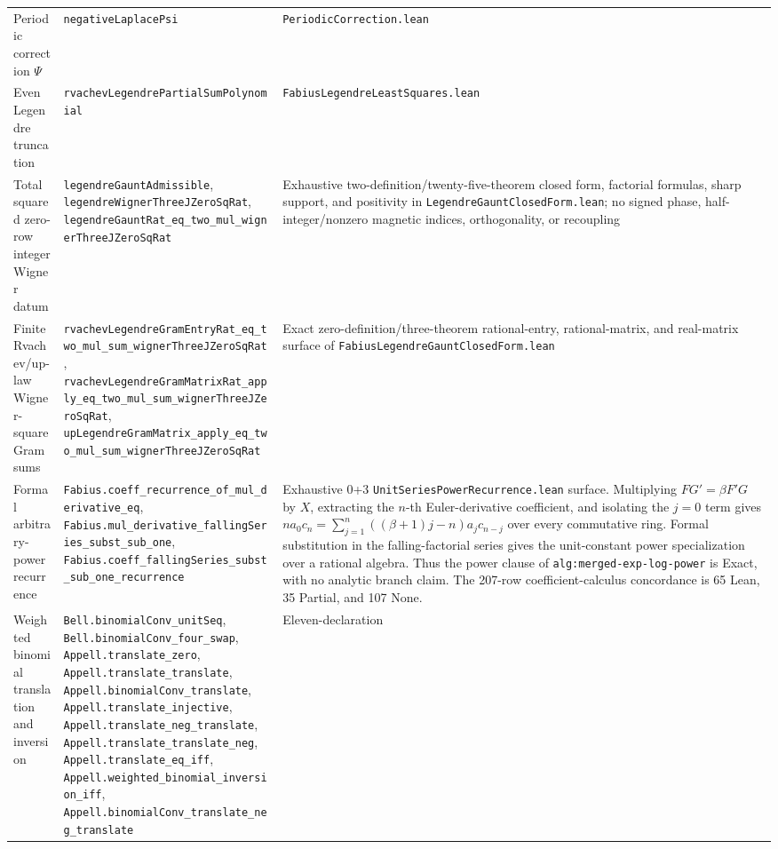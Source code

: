 \documentclass[11pt,oneside]{article}
\theoremstyle{definition}
\theoremstyle{remark}
\begin{document}
\begin{longtable}{@{}>{\raggedright\arraybackslash}p{} >{\raggedright\arraybackslash}p{} >{\raggedright\arraybackslash}p{}@{}}
Periodic correction \(\Psi\) & \nolinkurl{negativeLaplacePsi} & \nolinkurl{PeriodicCorrection.lean} \\
Even Legendre truncation & \nolinkurl{rvachevLegendrePartialSumPolynomial} & \nolinkurl{FabiusLegendreLeastSquares.lean} \\
Total squared zero-row integer Wigner datum & \nolinkurl{legendreGauntAdmissible}, \nolinkurl{legendreWignerThreeJZeroSqRat}, \nolinkurl{legendreGauntRat_eq_two_mul_wignerThreeJZeroSqRat} & Exhaustive two-definition/twenty-five-theorem closed form, factorial formulas, sharp support, and positivity in \nolinkurl{LegendreGauntClosedForm.lean}; no signed phase, half-integer/nonzero magnetic indices, orthogonality, or recoupling \\
Finite Rvachev/up-law Wigner-square Gram sums & \nolinkurl{rvachevLegendreGramEntryRat_eq_two_mul_sum_wignerThreeJZeroSqRat}, \nolinkurl{rvachevLegendreGramMatrixRat_apply_eq_two_mul_sum_wignerThreeJZeroSqRat}, \nolinkurl{upLegendreGramMatrix_apply_eq_two_mul_sum_wignerThreeJZeroSqRat} & Exact zero-definition/three-theorem rational-entry, rational-matrix, and real-matrix surface of \nolinkurl{FabiusLegendreGauntClosedForm.lean} \\
Formal arbitrary-power recurrence &
\nolinkurl{Fabius.coeff_recurrence_of_mul_derivative_eq},
\nolinkurl{Fabius.mul_derivative_fallingSeries_subst_sub_one},
\nolinkurl{Fabius.coeff_fallingSeries_subst_sub_one_recurrence} & Exhaustive
0+3 \nolinkurl{UnitSeriesPowerRecurrence.lean} surface.  Multiplying
\(FG'=\beta F'G\) by \(X\), extracting the \(n\)-th Euler-derivative
coefficient, and isolating the \(j=0\) term gives
\(na_0c_n=\sum_{j=1}^n((\beta+1)j-n)a_jc_{n-j}\) over every commutative
ring.  Formal substitution in the falling-factorial series gives the
unit-constant power specialization over a rational algebra.  Thus the power
clause of \nolinkurl{alg:merged-exp-log-power} is Exact, with no analytic
branch claim.  The 207-row coefficient-calculus concordance is 65 Lean,
35 Partial, and 107 None. \\
Weighted binomial translation and inversion &
\nolinkurl{Bell.binomialConv_unitSeq},
\nolinkurl{Bell.binomialConv_four_swap},
\nolinkurl{Appell.translate_zero},
\nolinkurl{Appell.translate_translate},
\nolinkurl{Appell.binomialConv_translate},
\nolinkurl{Appell.translate_injective},
\nolinkurl{Appell.translate_neg_translate},
\nolinkurl{Appell.translate_translate_neg},
\nolinkurl{Appell.translate_eq_iff},
\nolinkurl{Appell.weighted_binomial_inversion_iff},
\nolinkurl{Appell.binomialConv_translate_neg_translate} & Eleven-declaration

\end{longtable}
\end{document}
